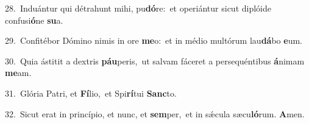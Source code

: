 {\numbfont\textcolor{\numbcolor}{28.}}~Induántur qui détrahunt mihi, pu\-\textbf{dó}\-re:~\star et operiántur sicut diplóide confusi\-\textbf{ó}\-ne \textbf{su}\-a.\par
{\numbfont\textcolor{\numbcolor}{29.}}~Confitébor Dómino nimis in ore \textbf{me}\-o:~\star et in médio multórum lau\-\textbf{dá}\-bo \textbf{e}\-um.\par
{\numbfont\textcolor{\numbcolor}{30.}}~Quia ástitit a dextris \textbf{páu}\-peris,~\star ut salvam fáceret a persequéntibus \textbf{á}\-nimam \textbf{me}\-am.\par
{\numbfont\textcolor{\numbcolor}{31.}}~Glória Patri, et \textbf{Fí}\-lio,~\star et Spi\-\textbf{rí}\-tui \textbf{Sanc}\-to.\par
{\numbfont\textcolor{\numbcolor}{32.}}~Sicut erat in princípio, et nunc, et \textbf{sem}\-per,~\star et in sǽcula sæcu\-\textbf{ló}\-rum. \textbf{A}\-men.\par
